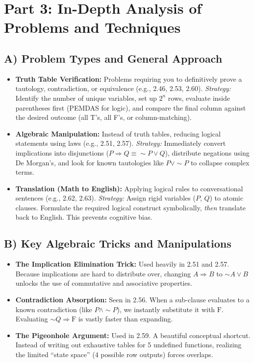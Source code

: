 \documentclass{article}
\begin{document}
\newpage
\section*{Part 3: In-Depth Analysis of Problems and Techniques}

\subsection*{A) Problem Types and General Approach}
\begin{itemize}
    \item \textbf{Truth Table Verification:} Problems requiring you to definitively prove a tautology, contradiction, or equivalence (e.g., 2.46, 2.53, 2.60). \textit{Strategy:} Identify the number of unique variables, set up $2^n$ rows, evaluate inside parentheses first (PEMDAS for logic), and compare the final column against the desired outcome (all T's, all F's, or column-matching).
    \item \textbf{Algebraic Manipulation:} Instead of truth tables, reducing logical statements using laws (e.g., 2.51, 2.57). \textit{Strategy:} Immediately convert implications into disjunctions ($P \Rightarrow Q \equiv \sim P \lor Q$), distribute negations using De Morgan's, and look for known tautologies like $P \lor \sim P$ to collapse complex terms.
    \item \textbf{Translation (Math to English):} Applying logical rules to conversational sentences (e.g., 2.62, 2.63). \textit{Strategy:} Assign rigid variables ($P$, $Q$) to atomic clauses. Formulate the required logical construct symbolically, \textit{then} translate back to English. This prevents cognitive bias.
\end{itemize}

\subsection*{B) Key Algebraic Tricks and Manipulations}
\begin{itemize}
    \item \textbf{The Implication Elimination Trick:} Used heavily in 2.51 and 2.57. Because implications are hard to distribute over, changing $A \Rightarrow B$ to $\sim A \lor B$ unlocks the use of commutative and associative properties.
    \item \textbf{Contradiction Absorption:} Seen in 2.56. When a sub-clause evaluates to a known contradiction (like $P \land \sim P$), we instantly substitute it with $\text{F}$. Evaluating $\sim Q \Rightarrow \text{F}$ is vastly faster than expanding.
    \item \textbf{The Pigeonhole Argument:} Used in 2.59. A beautiful conceptual shortcut. Instead of writing out exhaustive tables for 5 undefined functions, realizing the limited ``state space'' (4 possible row outputs) forces overlaps. 
\end{itemize}
\end{document}
